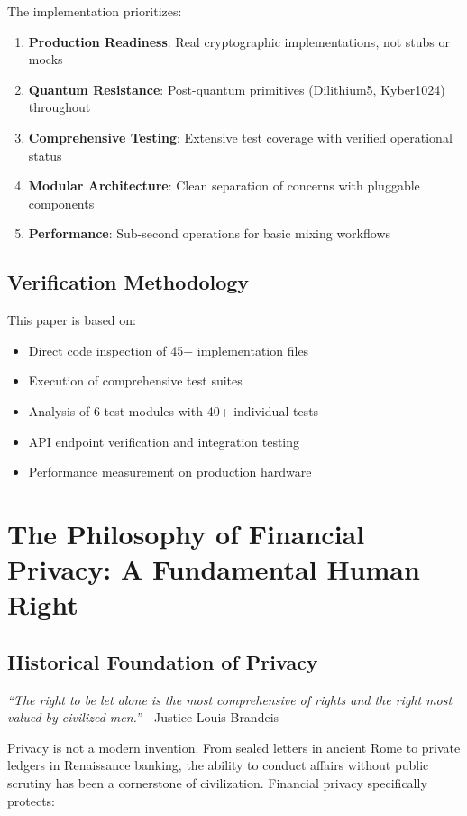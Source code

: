 \documentclass[12pt,a4paper]{article}
\begin{document}
The implementation prioritizes:

\begin{enumerate}
\item \textbf{Production Readiness}: Real cryptographic implementations, not stubs or mocks
\item \textbf{Quantum Resistance}: Post-quantum primitives (Dilithium5, Kyber1024) throughout
\item \textbf{Comprehensive Testing}: Extensive test coverage with verified operational status
\item \textbf{Modular Architecture}: Clean separation of concerns with pluggable components
\item \textbf{Performance}: Sub-second operations for basic mixing workflows
\end{enumerate}

\subsection{Verification Methodology}

This paper is based on:
\begin{itemize}
\item Direct code inspection of 45+ implementation files
\item Execution of comprehensive test suites
\item Analysis of 6 test modules with 40+ individual tests
\item API endpoint verification and integration testing
\item Performance measurement on production hardware
\end{itemize}

\section{The Philosophy of Financial Privacy: A Fundamental Human Right}

\subsection{Historical Foundation of Privacy}

\textit{``The right to be let alone is the most comprehensive of rights and the right most valued by civilized men.''} - Justice Louis Brandeis

Privacy is not a modern invention. From sealed letters in ancient Rome to private ledgers in Renaissance banking, the ability to conduct affairs without public scrutiny has been a cornerstone of civilization. Financial privacy specifically protects:
\end{document}
